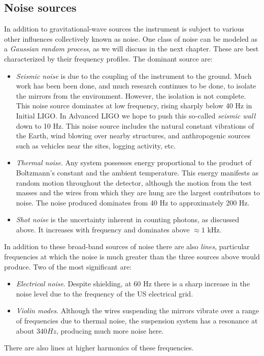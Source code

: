 \subsection{Noise sources}
\label{sec:noise_sources}

In addition to gravitational-wave sources the instrument is subject to
various other influences collectively known as noise.  One class of
noise can be modeled as a \emph{Gaussian random process}, as we will
discuss in the next chapter.  These are best characterized by their
frequency profiles.  The dominant source are:
%
\begin{itemize} 
\item \emph{Seismic noise} is due to the coupling of the
instrument to the ground.  Much work has been been done, and much
research continues to be done, to isolate the mirrors from the
environment.  However, the isolation is not complete.  This noise
source dominates at low frequency, rising sharply below 40 Hz in
Initial LIGO.  In Advanced LIGO we hope to push this so-called
\emph{seismic wall} down to 10 Hz.  This noise source includes the
natural constant vibrations of the Earth, wind blowing over nearby
structures, and anthropogenic sources such as vehicles near the sites,
logging activity, etc.

\item \emph{Thermal noise}. Any system possesses energy proportional
to the product of Boltzmann's constant and the ambient temperature.
This energy manifests as random motion throughout the detector,
although the motion from the test masses and the wires from which they
are hung are the largest contributors to noise.  The noise produced
dominates from 40 Hz to approximately 200 Hz.

\item \emph{Shot noise} is the uncertainty inherent in counting
photons, as discussed above.  It increases with frequency and
dominates above $\approx 1$ kHz.

\end{itemize}
%
In addition to these broad-band sources of noise there are also
\emph{lines}, particular frequencies at which the noise is much
greater than the three sources above would produce.  Two of the most
significant are:
%
\begin{itemize}
\item \emph{Electrical noise}.  Despite shielding, at 60 Hz there is a
sharp increase in the noise level due to the frequency of the US
electrical grid.
\item \emph{Violin modes}.  Although the wires suspending the mirrors
vibrate over a range of frequencies due to thermal noise, the
suspension system has a resonance at about $340 Hz$, producing much
more noise here.
\end{itemize}
%
There are also lines at higher harmonics of these frequencies.

